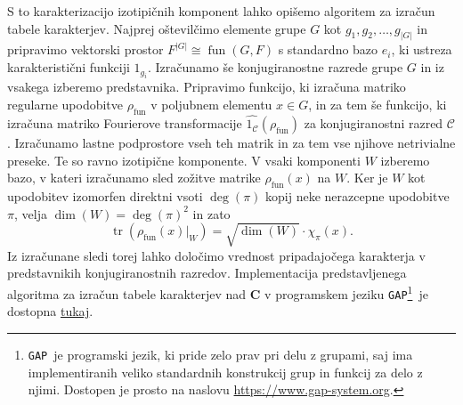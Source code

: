 \documentclass[11pt]{book}
\def\CC{\mathbf{C}}
\def\conclass{\mathcal{C}}
\DeclareMathOperator\tr{tr}
\def\GAP{\texttt{GAP}}
\DeclareMathOperator\fun{fun}
\theoremstyle{definition}
\theoremstyle{zgled}
\theoremstyle{odprtproblem}
\theoremstyle{domacanaloga}
\theoremstyle{izrek}
\begin{document}
S to karakterizacijo izotipičnih komponent lahko opišemo algoritem za izračun tabele karakterjev. Najprej oštevilčimo elemente grupe $G$ kot $g_1, g_2, \dots, g_{|G|}$ in pripravimo vektorski prostor $F^{|G|} \cong \fun(G,F)$ s standardno bazo $e_i$, ki ustreza karakteristični funkciji $1_{g_i}$. Izračunamo še konjugiranostne razrede grupe $G$ in iz vsakega izberemo predstavnika. Pripravimo funkcijo, ki izračuna matriko regularne upodobitve $\rho_{\fun}$ v poljubnem elementu $x \in G$, in za tem še funkcijo, ki izračuna matriko Fourierove transformacije $\widehat{1_{\conclass}}(\rho_{\fun})$ za konjugiranostni razred $\conclass$. Izračunamo lastne podprostore vseh teh matrik in za tem vse njihove netrivialne preseke. Te so ravno izotipične komponente. V vsaki komponenti $W$ izberemo bazo, v kateri izračunamo sled zožitve matrike $\rho_{\fun}(x)$ na $W$. Ker je $W$ kot upodobitev izomorfen direktni vsoti $\deg(\pi)$ kopij neke nerazcepne upodobitve $\pi$, velja $\dim(W) = \deg(\pi)^2$ in zato
\[
    \tr(\rho_{\fun}(x) |_W) = \sqrt{\dim(W)} \cdot \chi_{\pi}(x).
\]
Iz izračunane sledi torej lahko določimo vrednost pripadajočega karakterja v predstavnikih konjugiranostnih razredov. Implementacija predstavljenega algoritma za izračun tabele karakterjev nad $\CC$ v programskem jeziku \GAP\footnote{\GAP~je programski jezik, ki pride zelo prav pri delu z grupami, saj ima implementiranih veliko standardnih konstrukcij grup in funkcij za delo z njimi. Dostopen je prosto na naslovu \url{https://www.gap-system.org}.}~je dostopna \href{https://github.com/urbanjezernik/teorija-upodobitev/blob/main/racunanje-tabele.g}{tukaj}.
\end{document}
